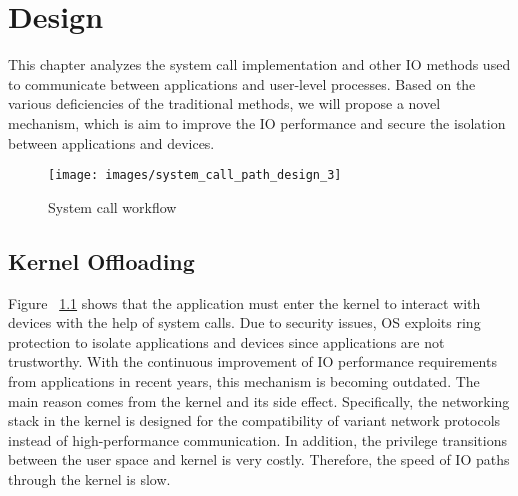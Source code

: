 \chapter{Design}
\label{sec:design}





This chapter analyzes the system call implementation and other 
IO methods used to communicate between applications 
and user-level processes. Based on the various deficiencies of the 
traditional methods, we will propose a novel mechanism, which is aim 
to improve the IO performance and secure the isolation 
between applications and devices.


\begin{figure}[H]
  \centering
  \texttt{[image: images/system\_call\_path\_design\_3]}
  \caption[Short description]{System call workflow}
  \label{fig:system_call_path_design_3}
\end{figure}

\section{Kernel Offloading}
Figure ~\ref{fig:system_call_path_design_3} shows that the application must enter the kernel 
to interact with devices with the help of system calls. 
Due to security issues, OS exploits ring protection to isolate 
applications and devices since applications are not trustworthy. 
With the continuous improvement of IO performance requirements 
from applications in recent years, this mechanism is becoming outdated. 
The main reason comes from the kernel and its side effect. Specifically, 
the networking stack in the kernel is designed for the compatibility of 
variant network protocols instead of high-performance communication. 
In addition, the privilege transitions between the user space and kernel 
is very costly. Therefore, the speed of IO paths through the kernel is slow.

